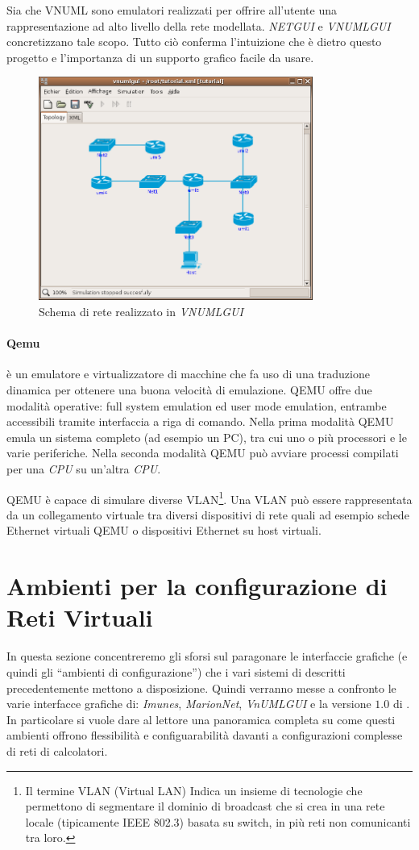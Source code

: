 Sia \netkit{} che VNUML sono emulatori realizzati per offrire all'utente una rappresentazione ad alto livello della rete modellata. \emph{NETGUI} e \emph{VNUMLGUI} concretizzano tale scopo. Tutto ciò conferma l'intuizione che è dietro questo progetto e l'importanza di un supporto grafico facile da usare.

\begin{figure}[!ht]
	\centering
	\includegraphics[width=9cm]{images/vnumlgui.png}
	\caption{Schema di rete realizzato in \emph{VNUMLGUI}}
	\label{figura:vnumlgui}
\end{figure}

\paragraph{Qemu}\cite{QUATC05} è un emulatore e virtualizzatore di macchine che fa uso di una traduzione dinamica per ottenere una buona velocità di emulazione. QEMU offre due modalità operative: full system emulation ed user mode emulation, entrambe accessibili tramite interfaccia a riga di comando. Nella prima modalità QEMU emula un sistema completo (ad esempio un PC), tra cui uno o più processori e le varie periferiche. Nella seconda modalità QEMU può avviare processi compilati per una \emph{CPU} su un'altra \emph{CPU}.

QEMU è capace di simulare diverse VLAN\footnote{Il termine VLAN (Virtual LAN) Indica un insieme di tecnologie che permettono di segmentare il dominio di broadcast che si crea in una rete locale (tipicamente IEEE 802.3) basata su switch, in più reti non comunicanti tra loro.}. Una VLAN può essere rappresentata da un collegamento virtuale tra diversi dispositivi di rete quali ad esempio schede Ethernet virtuali QEMU o dispositivi Ethernet su host virtuali.

\section{Ambienti per la configurazione di Reti Virtuali}
In questa sezione concentreremo gli sforsi sul paragonare le interfaccie grafiche (e quindi gli ``ambienti di configurazione'') che i vari sistemi di \emulazione{} descritti precedentemente mettono a disposizione. Quindi verranno messe a confronto le varie interfacce grafiche di: \emph{Imunes}, \emph{MarionNet}, \emph{VnUMLGUI} e la versione $1.0$ di \visualnetkit{}. In particolare si vuole dare al lettore una panoramica completa su come questi ambienti offrono flessibilità e configuarabilità davanti a configurazioni complesse di reti di calcolatori.

